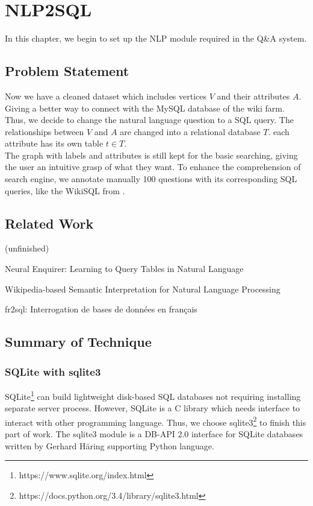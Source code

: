 \chapter{NLP2SQL}
\label{Ch-3:Sec:Extraction}

In this chapter, we begin to set up the NLP module required in the Q\&A system. 

\section{Problem Statement}

Now we have a cleaned dataset which includes vertices $V$ and their attributes $A$. Giving a better way to connect with the MySQL database of the wiki farm. Thus, we decide to change the natural language question to a SQL query. The relationships between $V$ and $A$ are changed into a relational database $T$. each attribute has its own table $t \in T$.\\
The graph with labels and attributes is still kept for the basic searching, giving the user an intuitive grasp of what they want. To enhance the comprehension of search engine, we annotate manually 100 questions with its corresponding SQL queries, like the WikiSQL from \cite{yin2015neural}.

\section{Related Work}
(unfinished)

Neural Enquirer: Learning to Query Tables in Natural Language
\cite{yin2015neural}

Wikipedia-based Semantic Interpretation for Natural Language Processing
\cite{gabrilovich2009wikipedia}

fr2sql: Interrogation de bases de données en français
\cite{couderc2015fr2sql}

\section{Summary of Technique}

\subsection{SQLite with sqlite3}

SQLite\footnote{https://www.sqlite.org/index.html} can build lightweight disk-based SQL databases not requiring installing separate server process. However, SQLite is a C library which needs interface to interact with other programming language. Thus, we choose sqlite3\footnote{https://docs.python.org/3.4/library/sqlite3.html} to finish this part of work. The sqlite3 module is a DB-API 2.0 interface for SQLite databases written by Gerhard Häring supporting Python language.

